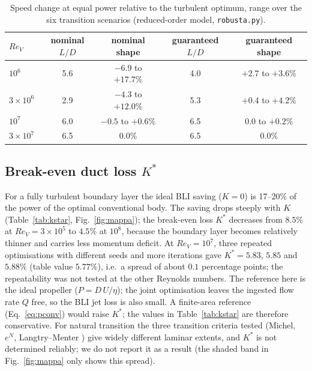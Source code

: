 \documentclass[11pt,a4paper]{article}
\newcommand{\ReV}{\mathit{Re}_V}
\begin{document}
\begin{table}[h]\centering
\caption{Speed change at equal power relative to the turbulent optimum, range over the six
transition scenarios (reduced-order model, \texttt{robusta.py}).}\label{tab:robusta}
\begin{tabular}{lcccc}
\toprule
$\ReV$ & nominal $L/D$ & nominal shape & guaranteed $L/D$ & guaranteed shape\\
\midrule
$10^6$ & 5.6 & $-6.9$ to $+17.7\%$ & 4.0 & $+2.7$ to $+3.6\%$\\
$3\times10^6$ & 2.9 & $-4.3$ to $+12.0\%$ & 5.3 & $+0.4$ to $+4.2\%$\\
$10^7$ & 6.0 & $-0.5$ to $+0.6\%$ & 6.5 & $0.0$ to $+0.2\%$\\
$3\times10^7$ & 6.5 & $0.0\%$ & 6.5 & $0.0\%$\\
\bottomrule
\end{tabular}
\end{table}

\subsection{Break-even duct loss $K^*$}
For a fully turbulent boundary layer the ideal BLI saving ($K=0$) is 17--20\% of the power
of the optimal conventional body. The saving drops steeply with $K$
(Table~\ref{tab:kstar}, Fig.~\ref{fig:mappa}); the break-even loss $K^*$ decreases from
$8.5\%$ at $\ReV=3\times10^5$ to $4.5\%$ at $10^8$, because the boundary layer becomes
relatively thinner and carries less momentum deficit. At $\ReV=10^7$, three repeated
optimisations with different seeds and more iterations gave $K^*=5.83$, $5.85$ and $5.88\%$
(table value $5.77\%$), i.e.\ a spread of about $0.1$ percentage points; the repeatability
was not tested at the other Reynolds numbers.
The reference here is the ideal propeller ($P=D\,U/\eta$); the joint optimisation leaves the
ingested flow rate $Q$ free, so the BLI jet loss is also small. A finite-area reference
(Eq.~\ref{eq:pconv}) would raise $K^*$; the values in Table~\ref{tab:kstar} are therefore
conservative.
For natural transition the three transition criteria tested (Michel, $e^N$, Langtry--Menter
\cite{langtry2009}) give widely different laminar extents, and $K^*$ is not determined
reliably; we do not report it as a result (the shaded band in Fig.~\ref{fig:mappa} only shows
this spread).
\end{document}
